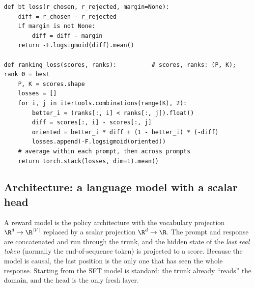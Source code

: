 \begin{lstlisting}[caption={Bradley--Terry and the grouped $K$-way ranking loss (\ident{llmsys/rlhf/losses.py}).},label={lst:rlhf:btloss}]
def bt_loss(r_chosen, r_rejected, margin=None):
    diff = r_chosen - r_rejected
    if margin is not None:
        diff = diff - margin
    return -F.logsigmoid(diff).mean()

def ranking_loss(scores, ranks):          # scores, ranks: (P, K); rank 0 = best
    P, K = scores.shape
    losses = []
    for i, j in itertools.combinations(range(K), 2):
        better_i = (ranks[:, i] < ranks[:, j]).float()
        diff = scores[:, i] - scores[:, j]
        oriented = better_i * diff + (1 - better_i) * (-diff)
        losses.append(-F.logsigmoid(oriented))
    # average within each prompt, then across prompts
    return torch.stack(losses, dim=1).mean()
\end{lstlisting}

\subsection{Architecture: a language model with a scalar head}

A reward model is the policy architecture with the vocabulary projection
$\R^{d}\to\R^{|V|}$ replaced by a scalar projection $\R^{d}\to\R$. The prompt and response are
concatenated and run through the trunk, and the hidden state of the \emph{last real token}
(normally the end-of-sequence token) is projected to a score. Because the model is causal, the
last position is the only one that has seen the whole response. Starting from the SFT model is
standard: the trunk already ``reads'' the domain, and the head is the only fresh layer.

